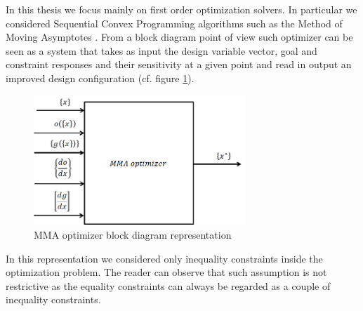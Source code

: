In this thesis we focus mainly on first order optimization solvers. In particular we considered Sequential Convex Programming algorithms such as the Method of Moving Asymptotes \cite{svanberg1987method,svanberg2002class}. From a block diagram point of view such optimizer can be seen as a system that takes as input the design variable vector, goal and constraint responses and their sensitivity at a given point and read in output an improved design configuration (cf. figure \ref{fig.2.5}).
\begin{figure}[ht]
\centering
\includegraphics[width=8cm]{images/Ch2/Optimizer_block}
\caption{MMA optimizer block diagram representation}
\label{fig.2.5}
\end{figure}
In this representation we considered only inequality constraints inside the optimization problem. The reader can observe that such assumption is not restrictive as the equality constraints can always be regarded as  a couple of inequality constraints.
